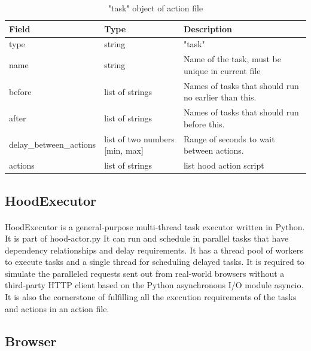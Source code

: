 \documentclass[mscthesis]{usiinfthesis}
\begin{document}
\begin{table}[H]
  \centering
  \begin{tabular}{|p{34mm}|p{26mm}|p{65mm}|}
    \hline
    Field                   & Type                           & Description                                          \\
    \hline
    type                    & string                         & "task"                                               \\
    name                    & string                         & Name of the task, must be unique in current file     \\
    before                  & list of strings                & Names of tasks that should run no earlier than this. \\
    after                   & list of strings                & Names of tasks that should run before this.          \\
    delay\_between\_actions & list of two numbers [min, max] & Range of seconds to wait between actions.            \\
    actions                 & list of strings                & list hood action script                              \\
    \hline
  \end{tabular}
  \caption{"task" object of action file}
  \label{tab:task_object}
\end{table}

\subsection{HoodExecutor}
\paragraph{}
HoodExecutor is a general-purpose multi-thread task executor written in Python. It is part of hood-actor.py It can run and schedule in parallel tasks that have dependency relationships and delay requirements. It has a thread pool of workers to execute tasks and a single thread for scheduling delayed tasks. It is required to simulate the paralleled requests sent out from real-world browsers without a third-party HTTP client based on the Python asynchronous I/O module asyncio. It is also the cornerstone of fulfilling all the execution requirements of the tasks and actions in an action file.

\subsection{Browser}\label{sec:browser}
\end{document}
